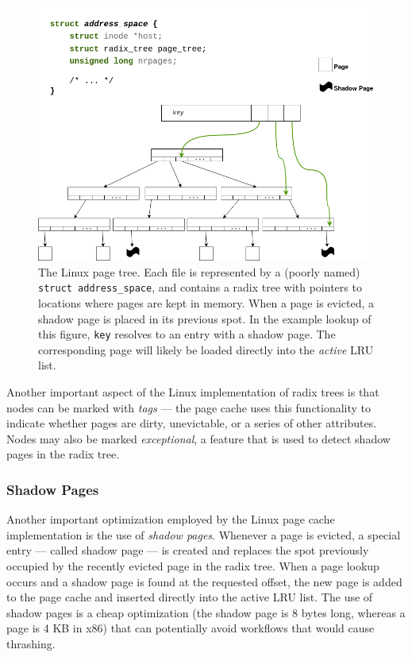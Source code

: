 \begin{figure}[h]
  \includegraphics[scale=0.3]{img/LinuxRadixTree.png}
  \caption{The Linux page tree. Each file is represented by a (poorly named)
  \texttt{struct address\_space}, and contains a radix tree with pointers to
  locations where pages are kept in memory. When a page is evicted, a shadow
  page is placed in its previous spot. In the example lookup of this figure,
  \texttt{key} resolves to an entry with a shadow page. The corresponding page
  will likely be loaded directly into the \emph{active} LRU list.}
  \label{fig:radix}
\end{figure}

Another important aspect of the Linux implementation of radix trees is that nodes
can be marked with \emph{tags} --- the page cache uses this functionality to
indicate whether pages are dirty, unevictable, or a series of other attributes.
Nodes may also be marked \emph{exceptional}, a feature that is used to detect
shadow pages in the radix tree.

\subsubsection{Shadow Pages} \label{sss:shadow}

Another important optimization employed by the Linux page cache implementation
is the use of \emph{shadow pages}. Whenever a page is evicted, a special entry
--- called shadow page --- is created and replaces the spot previously occupied
by the recently evicted page in the radix tree. When a page lookup occurs and a
shadow page is found at the requested offset, the new page is added to the page
cache and inserted directly into the active LRU list. The use of shadow pages
is a cheap optimization (the shadow page is 8 bytes long, whereas a page is 4 KB
in x86) that can potentially avoid workflows that would cause thrashing.

